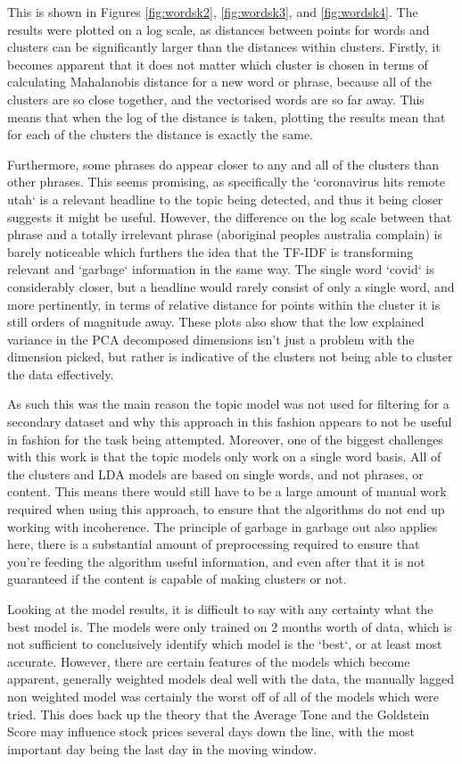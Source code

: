 This is shown in Figures \ref{fig:wordsk2}, \ref{fig:wordsk3}, and \ref{fig:wordsk4}. The results were plotted on a log scale, as distances between points for words and clusters can be significantly larger than the distances within clusters. Firstly, it becomes apparent that it does not matter which cluster is chosen in terms of calculating Mahalanobis distance for a new word or phrase, because all of the clusters are so close together, and the vectorised words are so far away. This means that when the log of the distance is taken, plotting the results mean that for each of the clusters the distance is exactly the same. 

Furthermore, some phrases do appear closer to any and all of the clusters than other phrases. This seems promising, as specifically the `coronavirus hits remote utah` is a relevant headline to the topic being detected, and thus it being closer suggests it might be useful. However, the difference on the log scale between that phrase and a totally irrelevant phrase (aboriginal peoples australia complain) is barely noticeable which furthers the idea that the TF-IDF is transforming relevant and `garbage` information in the same way. The single word `covid` is considerably closer, but a headline would rarely consist of only a single word, and more pertinently, in terms of relative distance for points within the cluster it is still orders of magnitude away. These plots also show that the low explained variance in the PCA decomposed dimensions isn't just a problem with the dimension picked, but rather is indicative of the clusters not being able to cluster the data effectively. 

As such this was the main reason the topic model was not used for filtering for a secondary dataset and why this approach in this fashion appears to not be useful in fashion for the task being attempted. Moreover, one of the biggest challenges with this work is that the topic models only work on a single word basis. All of the clusters and LDA models are based on single words, and not phrases, or content. This means there would still have to be a large amount of manual work required when using this approach, to ensure that the algorithms do not end up working with incoherence. The principle of garbage in garbage out also applies here, there is a substantial amount of preprocessing required to ensure that you're feeding the algorithm useful information, and even after that it is not guaranteed if the content is capable of making clusters or not.

Looking at the model results, it is difficult to say with any certainty what the best model is. The models were only trained on 2 months worth of data, which is not sufficient to conclusively identify which model is the `best`, or at least most accurate. However, there are certain features of the models which become apparent, generally weighted models deal well with the data, the manually lagged non weighted model was certainly the worst off of all of the models which were tried. This does back up the theory that the Average Tone and the Goldstein Score may influence stock prices several days down the line, with the most important day being the last day in the moving window. 

